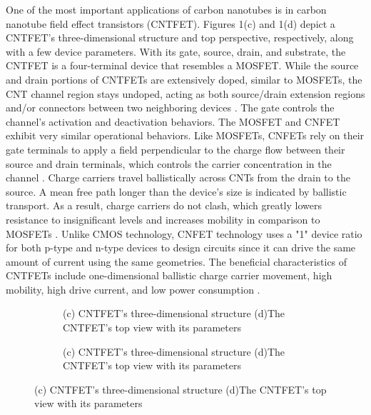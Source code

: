 One of the most important applications of carbon nanotubes is in carbon nanotube
field effect transistors (CNTFET). Figures 1(c) and 1(d) depict a CNTFET's
three-dimensional structure and top perspective, respectively, along with a few
device parameters. With its gate, source, drain, and substrate, the CNTFET is a
four-terminal device that resembles a MOSFET. While the source and drain
portions of CNTFETs are extensively doped, similar to MOSFETs, the CNT channel
region stays undoped, acting as both source/drain extension regions and/or
connectors between two neighboring devices \cite{ref17}. The gate controls the
channel's activation and deactivation behaviors. The MOSFET and CNFET exhibit
very similar operational behaviors. Like MOSFETs, CNFETs rely on their gate
terminals to apply a field perpendicular to the charge flow between their source
and drain terminals, which controls the carrier concentration in the channel
\cite{Imranetal2012} \cite{ref32}. Charge carriers travel ballistically across
CNTs from the drain to the source. A mean free path longer than the device's
size is indicated by ballistic transport. As a result, charge carriers do not
clash, which greatly lowers resistance to insignificant levels and increases
mobility in comparison to MOSFETs \cite{ref18}. Unlike CMOS technology, CNFET
technology uses a "1" device ratio for both p-type and n-type devices to design
circuits since it can drive the same amount of current using the same
geometries. The beneficial characteristics of CNTFETs include one-dimensional
ballistic charge carrier movement, high mobility, high drive current, and low
power consumption \cite{ref7,ref18,ref35}.

\begin{figure}[htbp]
  \centering
  \begin{subfigure}[b]{0.48\linewidth}
    \centering
    \caption{(c) CNTFET's three-dimensional structure (d)The CNTFET's top view with its parameters}

  \end{subfigure}
  \hfill
  \begin{subfigure}[b]{0.48\linewidth}
    \centering
    \caption{(c) CNTFET's three-dimensional structure (d)The CNTFET's top view with its parameters}

  \end{subfigure}
  \caption{(c) CNTFET's three-dimensional structure (d)The CNTFET's top view with its parameters}

  \label{fig:group_zhbfs}
\end{figure}

